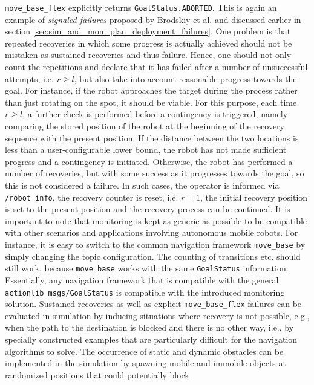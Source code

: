 \documentclass[english, master, utf8]{base/thesis_KBS}
\newcommand{\code}[1]{\colorbox{light-gray}{\texttt{#1}}}
\begin{document}
\code{move\_base\_flex} explicitly returns \code{GoalStatus.ABORTED}. This is again an example of \textit{signaled failures} proposed by Brodskiy et al. \cite{Brodskiy:2011} and
discussed earlier in section \ref{sec:sim_and_mon_plan_deployment_failures}.
One problem is that repeated recoveries in which some progress is actually achieved should not be mistaken as
sustained recoveries and thus failure. Hence, one should not only count the repetitions and declare that it has failed after a number of unsuccessful attempts, i.e. $r \geq l$, but
also take into account reasonable progress towards the goal. For instance, if the robot approaches the target during the process rather than just rotating on the spot, it should be
viable. For this purpose, each time $r \geq l$, a further check is performed before a contingency is triggered, namely comparing the stored position of the robot at the beginning of
the recovery sequence with the present position. If the distance between the two locations is less than a user-configurable lower bound, the robot has not made sufficient progress
and a contingency is initiated. Otherwise, the robot has performed a number of recoveries, but with some success as it progresses towards the goal, so this is not considered a
failure. In such cases, the operator is informed via \code{/robot\_info}, the recovery counter is reset, i.e. $r = 1$, the initial recovery position is set to the present position
and the recovery process can be continued.
It is important to note that monitoring is kept as generic as possible to be compatible with other scenarios and applications involving autonomous mobile robots.
For instance, it is easy to switch to the common navigation framework \code{move\_base} by simply changing the topic configuration.
The counting of transitions etc. should still work, because \code{move\_base} works with the same \code{GoalStatus} information.
Essentially, any navigation framework that is compatible with the general \code{actionlib\_msgs/GoalStatus} is compatible with the introduced monitoring solution.
\newline
Sustained recoveries as well as explicit \code{move\_base\_flex} failures can be evaluated in simulation by inducing situations where recovery is not possible, e.g., when the
path to the destination is blocked and there is no other way, i.e., by specially constructed examples that are particularly difficult for the navigation algorithms to solve.
The occurrence of static and dynamic obstacles can be implemented in the simulation by spawning mobile and immobile objects at randomized positions that could potentially block
\end{document}
